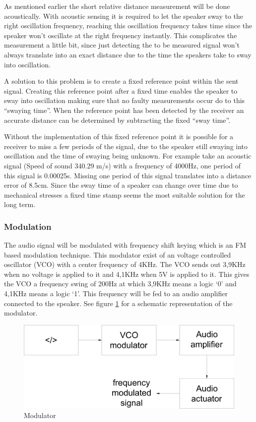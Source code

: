 \documentclass[10pt,a4paper]{article}
\begin{document}
As mentioned earlier the short relative distance measurement will be done acoustically. With acoustic sensing it is required to let the speaker sway to the right oscillation frequency, reaching this oscillation frequency takes time since the speaker won’t oscillate at the right frequency instantly. This complicates the measurement a little bit, since just detecting the to be measured signal won’t always translate into an exact distance due to the time the speakers take to sway into oscillation.

A solution to this problem is to create a fixed reference point within the sent signal. Creating this reference point after a fixed time enables the speaker to sway into oscillation making sure that no faulty measurements occur do to this “swaying time”. When the reference point has been detected by the receiver an accurate distance can be determined by subtracting the fixed “sway time”.

Without the implementation of this fixed reference point it is possible for a receiver to miss a few periods of the signal, due to the speaker still swaying into oscillation and the time of swaying being unknown. For example take an acoustic signal (Speed of sound 340.29 m/s) with a frequency of 4000Hz, one period of this signal is 0.00025s. Missing one period of this signal translates into a distance error of 8.5cm. Since the sway time of a speaker can change over time due to mechanical stresses a fixed time stamp seems the most suitable solution for the long term.

\subsubsection{Modulation}

The audio signal will be modulated with frequency shift keying which is an FM based modulation technique. This modulator exist of an voltage controlled oscillator (VCO) with a center frequency of 4KHz. The VCO sends out 3,9KHz when no voltage is applied to it and 4,1KHz when 5V is applied to it. This gives the VCO a frequency swing of 200Hz at which 3,9KHz means a logic ‘0’ and 4,1KHz means a logic ‘1’. This frequency will be fed to an audio amplifier connected to the speaker. See figure \ref{modulator} for a schematic representation of the modulator.

\begin{figure}[H]
  \centering
      \includegraphics[width=1\textwidth]{modulator.pdf}
  \caption{Modulator}
  \label{modulator}
\end{figure}
\end{document}
